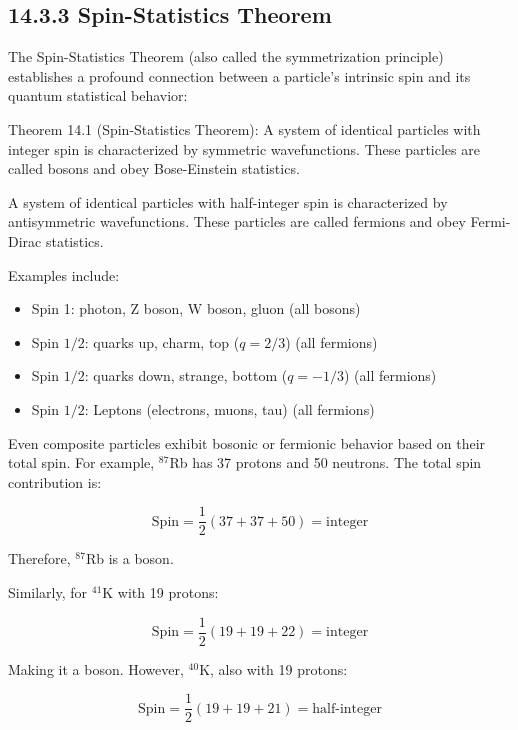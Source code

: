 \documentclass[italian]{HKNdocument}
\begin{document}
\subsection*{14.3.3 Spin-Statistics Theorem}
The Spin-Statistics Theorem (also called the symmetrization principle) establishes a profound connection between a particle's intrinsic spin and its quantum statistical behavior:

Theorem 14.1 (Spin-Statistics Theorem): A system of identical particles with integer spin is characterized by symmetric wavefunctions. These particles are called bosons and obey Bose-Einstein statistics.

A system of identical particles with half-integer spin is characterized by antisymmetric wavefunctions. These particles are called fermions and obey Fermi-Dirac statistics.

Examples include:
\begin{itemize}
  \item Spin 1: photon, Z boson, W boson, gluon (all bosons)
  \item Spin $1/2$: quarks up, charm, top ($q=2/3$) (all fermions)
  \item Spin $1/2$: quarks down, strange, bottom ($q=-1/3$) (all fermions)
  \item Spin $1/2$: Leptons (electrons, muons, tau) (all fermions)
\end{itemize}

Even composite particles exhibit bosonic or fermionic behavior based on their total spin. For example, $^{87}$Rb has 37 protons and 50 neutrons. The total spin contribution is:

\begin{equation*}
\text{Spin}=\frac{1}{2}(37+37+50)=\text{integer} \tag{14.28}
\end{equation*}

Therefore, $^{87}$Rb is a boson.

Similarly, for $^{41}$K with 19 protons:

\begin{equation*}
\text{Spin}=\frac{1}{2}(19+19+22)=\text{integer} \tag{14.29}
\end{equation*}

Making it a boson. However, $^{40}$K, also with 19 protons:

\begin{equation*}
\text{Spin}=\frac{1}{2}(19+19+21)=\text{half-integer} \tag{14.30}
\end{equation*}
\end{document}
